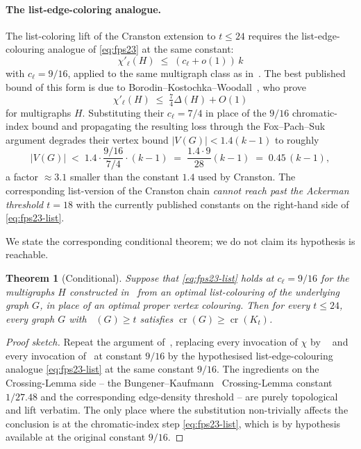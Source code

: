 \documentclass[11pt,a4paper]{article}
\newtheorem{theorem}{Theorem}
\theoremstyle{definition}
\DeclareMathOperator{\crN}{cr}
\DeclareMathOperator{\chl}{\chi_{\ell}}
\begin{document}
\paragraph{The list-edge-coloring analogue.}
The list-coloring lift of the Cranston extension to $t \le 24$
requires the list-edge-colouring analogue of \eqref{eq:fps23} at
the same constant:
\begin{equation}\label{eq:fps23-list}
   \chi'_{\ell}(H) \;\le\; (c_\ell + o(1))\,k
\end{equation}
with $c_\ell = 9/16$, applied to the same multigraph class as
in~\cite[Lemma~2.3]{FPS}. The best published bound of
this form is due to Borodin--Kostochka--Woodall~\cite{BKW}, who
prove
\[
   \chi'_{\ell}(H) \;\le\; \tfrac{7}{4}\Delta(H) + O(1)
\]
for multigraphs $H$. Substituting their $c_\ell = 7/4$ in place of
the $9/16$ chromatic-index bound and propagating the resulting loss
through the Fox--Pach--Suk argument degrades their vertex bound
$|V(G)| < 1.4(k - 1)$ to roughly
\[
   |V(G)| \;<\; 1.4 \cdot \frac{9/16}{7/4} \cdot (k - 1)
   \;=\; \frac{1.4 \cdot 9}{28}(k - 1)
   \;=\; 0.45\,(k - 1),
\]
a factor $\approx 3.1$ smaller than the constant $1.4$ used by
Cranston. The corresponding list-version of the Cranston chain
\emph{cannot reach past the Ackerman threshold $t = 18$} with the
currently published constants on the right-hand side of
\eqref{eq:fps23-list}.

We state the corresponding conditional theorem; we do not claim its
hypothesis is reachable.

\begin{theorem}[Conditional]\label{thm:conditional}
Suppose that \eqref{eq:fps23-list} holds at $c_\ell = 9/16$ for
the multigraphs $H$ constructed in~\cite[\S 3]{FPS} from an
optimal list-colouring of the underlying graph $G$, in place of an
optimal proper vertex colouring. Then for every $t \le 24$, every
graph $G$ with $\chl(G) \ge t$ satisfies $\crN(G) \ge \crN(K_t)$.
\end{theorem}

\begin{proof}[Proof sketch]
Repeat the argument of~\cite{Cranston}, replacing every invocation
of $\chi$ by $\chl$ and every invocation of~\cite[Lemma~2.3]{FPS}
at constant $9/16$ by the hypothesised list-edge-colouring
analogue \eqref{eq:fps23-list} at the same constant $9/16$. The
ingredients on the Crossing-Lemma side -- the
Bungener--Kaufmann~\cite{BK24} Crossing-Lemma constant $1/27.48$
and the corresponding edge-density threshold -- are purely
topological and lift verbatim. The only place where the
substitution non-trivially affects the conclusion is at the
chromatic-index step \eqref{eq:fps23-list}, which is by hypothesis
available at the original constant $9/16$.
\end{proof}
\end{document}
